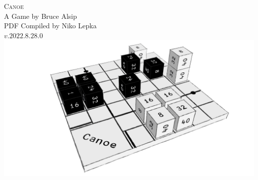 



\begin{titlepage}
\begin{center}
    \Huge \textsc{Canoe}\\
    \LARGE A Game by Bruce Alsip\\
    \large PDF Compiled by Niko Lepka\\
    $v.2022.8.28.0$\\\vspace{1cm}
    \includegraphics[width=\textwidth]{../graphics/canoe-cover}
\end{center}
\newpage
\end{titlepage}
\tableofcontents\newpage









